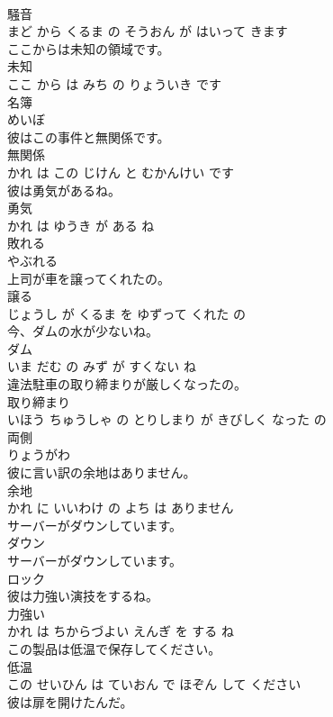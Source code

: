 \documentclass[8pt]{extreport}
\begin{document}
\begin{CJK}{UTF8}{min}
\\	騒音 
\\	まど から くるま の そうおん が はいって きます			
\\	ここからは未知の領域です。	
\\	未知 
\\	ここ から は みち の りょういき です			
\\	名簿	
\\	めいぼ		
\\	彼はこの事件と無関係です。	
\\	無関係 
\\	かれ は この じけん と むかんけい です			
\\	彼は勇気があるね。	
\\	勇気 
\\	かれ は ゆうき が ある ね			
\\	敗れる	
\\	やぶれる		
\\	上司が車を譲ってくれたの。	
\\	譲る 
\\	じょうし が くるま を ゆずって くれた の			
\\	今、ダムの水が少ないね。	
\\	ダム 
\\	いま だむ の みず が すくない ね			
\\	違法駐車の取り締まりが厳しくなったの。	
\\	取り締まり 
\\	いほう ちゅうしゃ の とりしまり が きびしく なった の			
\\	両側	
\\	りょうがわ		
\\	彼に言い訳の余地はありません。	
\\	余地 
\\	かれ に いいわけ の よち は ありません			
\\	サーバーがダウンしています。	
\\	ダウン 
\\	サーバーがダウンしています。			
\\	ロック	
\\	彼は力強い演技をするね。	
\\	力強い 
\\	かれ は ちからづよい えんぎ を する ね			
\\	この製品は低温で保存してください。	
\\	低温 
\\	この せいひん は ていおん で ほぞん して ください			
\\	彼は扉を開けたんだ。	

\end{CJK}
\end{document}
